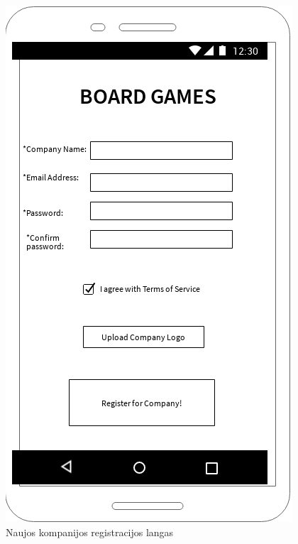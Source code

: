 \documentclass{VUMIFPSkursinis}
\begin{document}
\begin{figure}[H]
	\centering
	\includegraphics[scale=0.9]{img/company_register}
	\caption{Naujos kompanijos registracijos langas}
	\label{img:company_register}
\end{figure}
\end{document}
